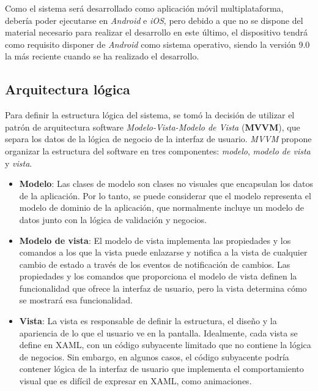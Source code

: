 Como el sistema será desarrollado como aplicación móvil multiplataforma, debería poder ejecutarse en \textit{Android} e 
\textit{iOS}, pero debido a que no se dispone del material necesario para realizar el desarrollo en este último, el 
dispositivo tendrá como requisito disponer de \textit{Android} como sistema operativo, siendo la versión 9.0 la más 
reciente cuando se ha realizado el desarrollo.


\subsection{Arquitectura lógica}
Para definir la estructura lógica del sistema, se tomó la decisión de utilizar el patrón de arquitectura software 
\textit{Modelo-Vista-Modelo de Vista} (\textbf{MVVM}), que separa los datos de la lógica de negocio de la interfaz 
de usuario. \textit{MVVM} propone organizar la estructura del software en tres componentes: \textit{modelo}, 
\textit{modelo de vista} y \textit{vista}.
\begin{itemize}

    \item \textbf{Modelo}: Las clases de modelo son clases no 
    visuales que encapsulan los datos de la aplicación. Por lo tanto, se 
    puede considerar que el modelo representa el modelo de dominio de la 
    aplicación, que normalmente incluye un modelo de datos junto con la 
    lógica de validación y negocios. 

    \item \textbf{Modelo de vista}: El modelo de vista implementa las 
    propiedades y los comandos a los que la vista puede enlazarse y notifica 
    a la vista de cualquier cambio de estado a través de los eventos de 
    notificación de cambios. Las propiedades y los comandos que proporciona 
    el modelo de vista definen la funcionalidad que ofrece la interfaz de 
    usuario, pero la vista determina cómo se mostrará esa funcionalidad.

    \item \textbf{Vista}: La vista es responsable de definir 
    la estructura, el diseño y la apariencia de lo que el usuario ve 
    en la pantalla. Idealmente, cada vista se define en XAML, con un 
    código subyacente limitado que no contiene la lógica de negocios. 
    Sin embargo, en algunos casos, el código subyacente podría contener 
    lógica de la interfaz de usuario que implementa el comportamiento 
    visual que es difícil de expresar en XAML, como animaciones.

\end{itemize}
